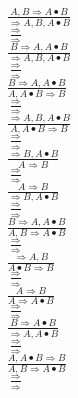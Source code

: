 \documentclass[11pt]{article}
\begin{document}
\begin{center}
\bigskip
\\$\frac{A, B\Rightarrow A\bullet B}{\Rightarrow A, B, A\bullet B}$
\bigskip
\\$\frac{\Rightarrow }{\Rightarrow }$
\bigskip
\\$\frac{B\Rightarrow A, A\bullet B}{\Rightarrow A, B, A\bullet B}$
\bigskip
\\$\frac{\Rightarrow }{\Rightarrow }$
\bigskip
\\$\frac{B\Rightarrow A, A\bullet B}{A, A\bullet B\Rightarrow B}$
\bigskip
\\$\frac{\Rightarrow }{\Rightarrow }$
\bigskip
\\$\frac{\Rightarrow A, B, A\bullet B}{A, A\bullet B\Rightarrow B}$
\bigskip
\\$\frac{\Rightarrow }{\Rightarrow }$
\bigskip
\\$\frac{\Rightarrow B, A\bullet B}{A\Rightarrow B}$
\bigskip
\\$\frac{\Rightarrow }{\Rightarrow }$
\bigskip
\\$\frac{A\Rightarrow B}{\Rightarrow B, A\bullet B}$
\bigskip
\\$\frac{\Rightarrow }{\Rightarrow }$
\bigskip
\\$\frac{B\Rightarrow A, A\bullet B}{A, B\Rightarrow A\bullet B}$
\bigskip
\\$\frac{\Rightarrow }{\Rightarrow }$
\bigskip
\\$\frac{\Rightarrow A, B}{A\bullet B\Rightarrow B}$
\bigskip
\\$\frac{\Rightarrow }{\Rightarrow }$
\bigskip
\\$\frac{A\Rightarrow B}{A\Rightarrow A\bullet B}$
\bigskip
\\$\frac{\Rightarrow }{\Rightarrow }$
\bigskip
\\$\frac{B\Rightarrow A\bullet B}{\Rightarrow A, A\bullet B}$
\bigskip
\\$\frac{\Rightarrow }{\Rightarrow }$
\bigskip
\\$\frac{A, A\bullet B\Rightarrow B}{A, B\Rightarrow A\bullet B}$
\bigskip
\\$\frac{\Rightarrow }{\Rightarrow }$
\bigskip
\\
\end{center}
\end{document}
